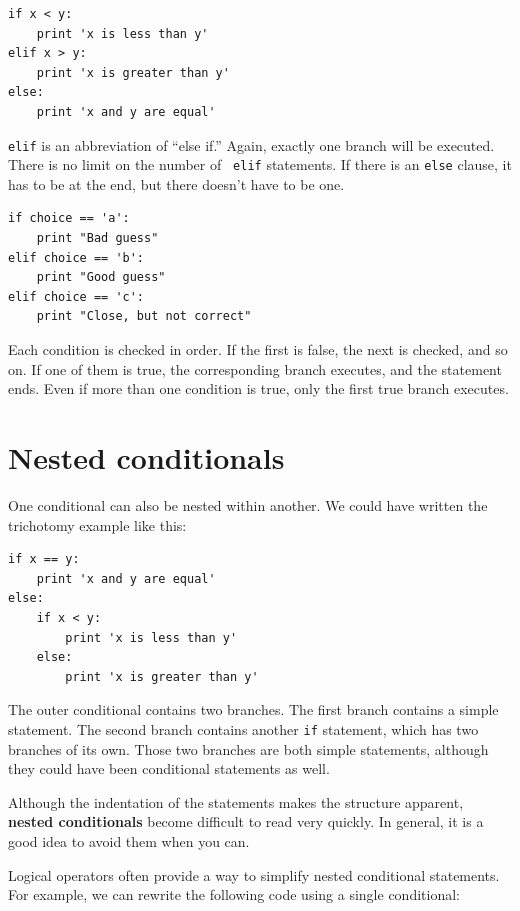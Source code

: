 \documentclass[10pt]{book}
\begin{document}
\beforeverb
\begin{verbatim}
if x < y:
    print 'x is less than y'
elif x > y:
    print 'x is greater than y'
else:
    print 'x and y are equal'
\end{verbatim}
\afterverb
%
{\tt elif} is an abbreviation of ``else if.''  Again, exactly one
branch will be executed.  There is no limit on the number of {\tt
elif} statements.  If there is an {\tt else} clause, it has to be
at the end, but there doesn't have to be one.



\beforeverb
\begin{verbatim}
if choice == 'a':
    print "Bad guess"
elif choice == 'b':
    print "Good guess"
elif choice == 'c':
    print "Close, but not correct"
\end{verbatim}
\afterverb
%
Each condition is checked in order.  If the first is false,
the next is checked, and so on.  If one of them is
true, the corresponding branch executes, and the statement
ends.  Even if more than one condition is true, only the
first true branch executes.  


\section{Nested conditionals}

One conditional can also be nested within another.  We could have
written the trichotomy example like this:

\beforeverb
\begin{verbatim}
if x == y:
    print 'x and y are equal'
else:
    if x < y:
        print 'x is less than y'
    else:
        print 'x is greater than y'
\end{verbatim}
\afterverb
%
The outer conditional contains two branches.  The
first branch contains a simple statement.  The second branch
contains another {\tt if} statement, which has two branches of its
own.  Those two branches are both simple statements,
although they could have been conditional statements as well.

Although the indentation of the statements makes the structure
apparent, {\bf nested conditionals} become difficult to read very
quickly. In general, it is a good idea to avoid them when you can.

Logical operators often provide a way to simplify nested conditional
statements.  For example, we can rewrite the following code using a
single conditional:
\end{document}
